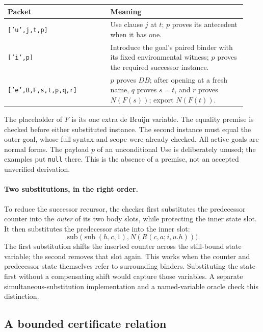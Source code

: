 \documentclass[11pt]{article}
\theoremstyle{definition}\newtheorem{definition}[theorem]{Definition}
\theoremstyle{remark}\newtheorem{remark}[theorem]{Remark}
\begin{document}
\begin{center}
\begin{tabular}{p{0.40\linewidth}p{0.53\linewidth}}
\toprule
Packet & Meaning\\
\midrule
\texttt{['u',j,t,p]} & Use clause $j$ at $t$; $p$ proves its antecedent
when it has one.\\[3pt]
\texttt{['i',p]} & Introduce the goal's paired binder with its fixed
environmental witness; $p$ proves the required successor instance.\\[3pt]
\texttt{['e',B,F,s,t,p,q,r]} & $p$ proves $D B$; after opening at a
fresh name, $q$ proves $s=t$, and $r$ proves $N(F(s))$; export $N(F(t))$.\\
\bottomrule
\end{tabular}
\end{center}

The placeholder of $F$ is its one extra de Bruijn variable. The equality
premise is checked before either substituted instance. The second
instance must equal the outer goal, whose full syntax and scope were
already checked. All active goals are normal forms. The payload $p$
of an unconditional Use is deliberately unused; the examples put
\texttt{null} there. This is the absence of a premise, not an accepted
unverified derivation.

\paragraph{Two substitutions, in the right order.}
To reduce the successor recursor, the checker first substitutes the
predecessor counter into the \emph{outer} of its two body slots, while
protecting the inner state slot. It then substitutes the predecessor
state into the inner slot:
\[
 \operatorname{sub}\bigl(\operatorname{sub}(h,c,1),
                         N(R(c,a;i,u.h))\bigr).
\]
The first substitution shifts the inserted counter across the still-bound
state variable; the second removes that slot again. This works when
the counter and predecessor state themselves refer to surrounding
binders. Substituting the state first without a compensating shift would
capture those variables. A separate simultaneous-substitution implementation
and a named-variable oracle check this distinction.

\subsection{A bounded certificate relation}
\end{document}
